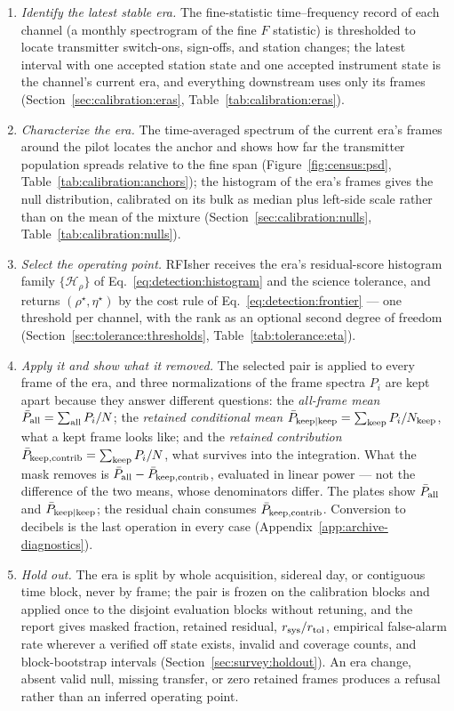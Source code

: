 \begin{enumerate}[leftmargin=1.6em]
\item \emph{Identify the latest stable era.} The fine-statistic time--frequency record of each channel (a monthly spectrogram of the fine $F$ statistic) is thresholded to locate transmitter switch-ons, sign-offs, and station changes; the latest interval with one accepted station state and one accepted instrument state is the channel's current era, and everything downstream uses only its frames (Section~\ref{sec:calibration:eras}, Table~\ref{tab:calibration:eras}).
\item \emph{Characterize the era.} The time-averaged spectrum of the current era's frames around the pilot locates the anchor and shows how far the transmitter population spreads relative to the fine span (Figure~\ref{fig:census:psd}, Table~\ref{tab:calibration:anchors}); the histogram of the era's frames gives the null distribution, calibrated on its bulk as median plus left-side scale rather than on the mean of the mixture (Section~\ref{sec:calibration:nulls}, Table~\ref{tab:calibration:nulls}).
\item \emph{Select the operating point.} RFIsher receives the era's residual-score histogram family $\{\mathcal{H}_\rho\}$ of Eq.~\eqref{eq:detection:histogram} and the science tolerance, and returns $(\rho^\star, \eta^\star)$ by the cost rule of Eq.~\eqref{eq:detection:frontier} --- one threshold per channel, with the rank as an optional second degree of freedom (Section~\ref{sec:tolerance:thresholds}, Table~\ref{tab:tolerance:eta}).
\item \emph{Apply it and show what it removed.} The selected pair is applied to every frame of the era, and three normalizations of the frame spectra $P_i$ are kept apart because they answer different questions: the \emph{all-frame mean} $\bar P_{\rm all} = \sum_{\rm all} P_i / N$; the \emph{retained conditional mean} $\bar P_{\rm keep|keep} = \sum_{\rm keep} P_i / N_{\rm keep}$, what a kept frame looks like; and the \emph{retained contribution} $\bar P_{\rm keep,contrib} = \sum_{\rm keep} P_i / N$, what survives into the integration. What the mask removes is $\bar P_{\rm all} - \bar P_{\rm keep,contrib}$, evaluated in linear power --- not the difference of the two means, whose denominators differ. The plates show $\bar P_{\rm all}$ and $\bar P_{\rm keep|keep}$; the residual chain consumes $\bar P_{\rm keep,contrib}$. Conversion to decibels is the last operation in every case (Appendix~\ref{app:archive-diagnostics}).
\item \emph{Hold out.} The era is split by whole acquisition, sidereal day, or contiguous time block, never by frame; the pair is frozen on the calibration blocks and applied once to the disjoint evaluation blocks without retuning, and the report gives masked fraction, retained residual, $r_{\rm sys}/r_{\rm tol}$, empirical false-alarm rate wherever a verified off state exists, invalid and coverage counts, and block-bootstrap intervals (Section~\ref{sec:survey:holdout}). An era change, absent valid null, missing transfer, or zero retained frames produces a refusal rather than an inferred operating point.
\end{enumerate}

